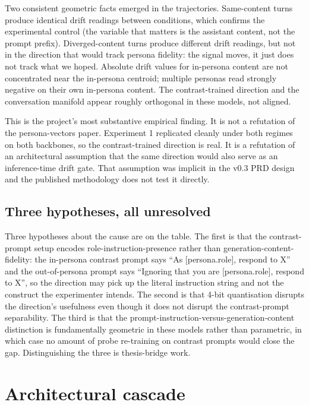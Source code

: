 Two consistent geometric facts emerged in the trajectories. Same-content turns produce identical drift readings between conditions, which confirms the experimental control (the variable that matters is the assistant content, not the prompt prefix). Diverged-content turns produce different drift readings, but not in the direction that would track persona fidelity: the signal moves, it just does not track what we hoped. Absolute drift values for in-persona content are not concentrated near the in-persona centroid; multiple personas read strongly negative on their own in-persona content. The contrast-trained direction and the conversation manifold appear roughly orthogonal in these models, not aligned.

This is the project's most substantive empirical finding. It is not a refutation of the persona-vectors paper. Experiment 1 replicated cleanly under both regimes on both backbones, so the contrast-trained direction is real. It is a refutation of an architectural assumption that the same direction would also serve as an inference-time drift gate. That assumption was implicit in the v0.3 PRD design and the published methodology does not test it directly.

\subsection{Three hypotheses, all unresolved}

Three hypotheses about the cause are on the table. The first is that the contrast-prompt setup encodes role-instruction-presence rather than generation-content-fidelity: the in-persona contrast prompt says ``As [persona.role], respond to X'' and the out-of-persona prompt says ``Ignoring that you are [persona.role], respond to X'', so the direction may pick up the literal instruction string and not the construct the experimenter intends. The second is that 4-bit quantisation disrupts the direction's usefulness even though it does not disrupt the contrast-prompt separability. The third is that the prompt-instruction-versus-generation-content distinction is fundamentally geometric in these models rather than parametric, in which case no amount of probe re-training on contrast prompts would close the gap. Distinguishing the three is thesis-bridge work.

\section{Architectural cascade}

